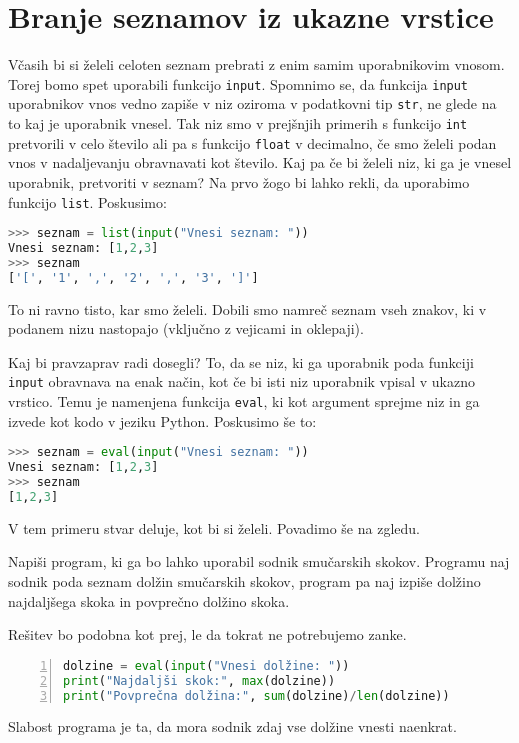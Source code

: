 \section{Branje seznamov iz ukazne vrstice}
Včasih bi si želeli celoten seznam prebrati z enim samim uporabnikovim vnosom. Torej bomo spet uporabili funkcijo \texttt{input}. Spomnimo se, da funkcija \texttt{input} uporabnikov vnos vedno zapiše v niz oziroma v podatkovni tip \texttt{str}, ne glede na to kaj je uporabnik vnesel. Tak niz smo v prejšnjih primerih s funkcijo \texttt{int} pretvorili v celo število ali pa s funkcijo \texttt{float} v decimalno, če smo želeli podan vnos v nadaljevanju obravnavati kot število. Kaj pa če bi želeli niz, ki ga je vnesel uporabnik, pretvoriti v seznam? Na prvo žogo bi lahko rekli, da uporabimo funkcijo \texttt{list}. Poskusimo:
\begin{lstlisting}[language=Python]
>>> seznam = list(input("Vnesi seznam: "))
Vnesi seznam: [1,2,3]
>>> seznam
['[', '1', ',', '2', ',', '3', ']']
\end{lstlisting}
To ni ravno tisto, kar smo želeli. Dobili smo namreč seznam vseh znakov, ki v podanem nizu nastopajo (vključno z vejicami in oklepaji).

Kaj bi pravzaprav radi dosegli? To, da se niz, ki ga uporabnik poda funkciji \texttt{input} obravnava na enak način, kot če bi isti niz uporabnik vpisal v ukazno vrstico. Temu je namenjena funkcija \texttt{eval}, ki kot argument sprejme niz in ga izvede kot kodo v jeziku Python. Poskusimo še to:
\begin{lstlisting}[language=Python]
>>> seznam = eval(input("Vnesi seznam: "))
Vnesi seznam: [1,2,3]
>>> seznam
[1,2,3]
\end{lstlisting}
V tem primeru stvar deluje, kot bi si želeli. Povadimo še na zgledu.

\begin{zgled}
Napiši program, ki ga bo lahko uporabil sodnik smučarskih skokov. Programu naj sodnik poda seznam dolžin smučarskih skokov, program pa naj izpiše dolžino najdaljšega skoka in povprečno dolžino skoka.
\end{zgled}
\begin{resitev}
Rešitev bo podobna kot prej, le da tokrat ne potrebujemo zanke.
\begin{lstlisting}[language=Python,numbers=left]
dolzine = eval(input("Vnesi dolžine: "))
print("Najdaljši skok:", max(dolzine))
print("Povprečna dolžina:", sum(dolzine)/len(dolzine))
\end{lstlisting}
Slabost programa je ta, da mora sodnik zdaj vse dolžine vnesti naenkrat. 
\end{resitev}

